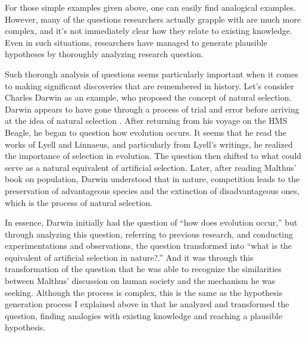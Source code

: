 \documentclass{article}
\begin{document}
For those simple examples given above, one can easily find analogical examples. However, many of the questions researchers actually grapple with are much more complex, and it's not immediately clear how they relate to existing knowledge. Even in such situations, researchers have managed to generate plausible hypotheses by thoroughly analyzing research question.

Such thorough analysis of questions seems particularly important when it comes to making significant discoveries that are remembered in history. Let's consider Charles Darwin as an example, who proposed the concept of natural selection. Darwin appears to have gone through a process of trial and error before arriving at the idea of natural selection \cite{gribbin2022origin}. After returning from his voyage on the HMS Beagle, he began to question how evolution occurs. It seems that he read the works of Lyell and Linnaeus, and particularly from Lyell's writings, he realized the importance of selection in evolution. The question then shifted to what could serve as a natural equivalent of artificial selection. Later, after reading Malthus' book on population, Darwin understood that in nature, competition leads to the preservation of advantageous species and the extinction of disadvantageous ones, which is the process of natural selection.

In essence, Darwin initially had the question of ``how does evolution occur,'' but through analyzing this question, referring to previous research, and conducting experimentations and observations, the question transformed into ``what is the equivalent of artificial selection in nature?.'' And it was through this transformation of the question that he was able to recognize the similarities between Malthus' discussion on human society and the mechanism he was seeking. Although the process is complex, this is the same as the hypothesis generation process I explained above in that he analyzed and transformed the question, finding analogies with existing knowledge and reaching a plausible hypothesis.
\end{document}
